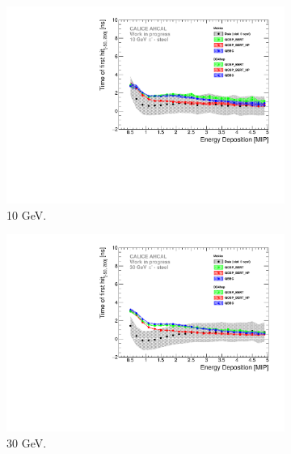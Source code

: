 \begin{figure}[htbp!]
	\begin{subfigure}[t]{0.5\textwidth}
		\centering
		\includegraphics[width=1\textwidth]{../Thesis_Plots/Timing/Pions/Plots/ComparisonToSim/Time_Energy_10GeV.pdf}
		\caption{10 GeV.} \label{fig:Energy_SimData_10GeV}
	\end{subfigure}
	\hfill
	\begin{subfigure}[t]{0.5\textwidth}
		\centering
		\includegraphics[width=1\textwidth]{../Thesis_Plots/Timing/Pions/Plots/ComparisonToSim/Time_Energy_30GeV.pdf}
		\caption{30 GeV.}\label{fig:Energy_SimData_30GeV}
	\end{subfigure}
	\begin{subfigure}[t]{0.5\textwidth}
		\centering

\end{subfigure}
\end{figure}
